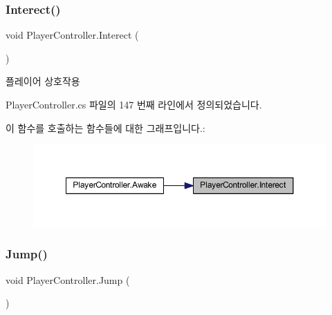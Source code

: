 \mbox{\label{class_player_controller_a2af84a2de0a9c5b304d91cc674e76fc1}} 
\subsubsection{\texorpdfstring{Interect()}{Interect()}}
{\footnotesize\ttfamily void Player\+Controller.\+Interect (\begin{DoxyParamCaption}{ }\end{DoxyParamCaption})}



플레이어 상호작용 



Player\+Controller.\+cs 파일의 147 번째 라인에서 정의되었습니다.


\begin{DoxyCode}{0}

\end{DoxyCode}
이 함수를 호출하는 함수들에 대한 그래프입니다.\+:\nopagebreak
\begin{figure}[H]
\begin{center}
\leavevmode
\includegraphics[width=350pt]{dc/dde/class_player_controller_a2af84a2de0a9c5b304d91cc674e76fc1_icgraph}
\end{center}
\end{figure}
\mbox{\label{class_player_controller_a8a7010cb6f3c524737be3f6f77553df9}} 
\subsubsection{\texorpdfstring{Jump()}{Jump()}}
{\footnotesize\ttfamily void Player\+Controller.\+Jump (\begin{DoxyParamCaption}{ }\end{DoxyParamCaption})}



